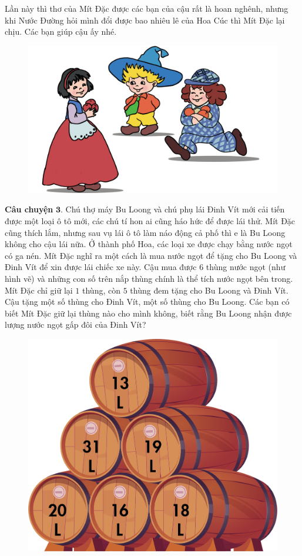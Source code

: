 	\vskip 0.1cm
	Lần này thì thơ của Mít Đặc được các bạn của cậu rất là hoan nghênh, nhưng khi Nước Đường hỏi mình đổi được bao nhiêu lê của Hoa Cúc thì Mít Đặc lại chịu. Các bạn giúp cậu ấy nhé.
	\begin{figure}[H]
		\centering
		\vspace*{-5pt}
		\captionsetup{labelformat= empty, justification=centering}
		\includegraphics[width=0.6\linewidth]{Hinh4_TaoLe}
		\vspace*{-10pt}
	\end{figure}
	\textbf{\color{toancuabi}Câu chuyện} $\pmb{3.}$ Chú thợ máy Bu Loong và chú phụ lái Đinh Vít mới cải tiến được một loại ô tô mới, các chú tí hon ai cũng háo hức để được lái thử. Mít Đặc cũng thích lắm, nhưng sau vụ lái ô tô làm náo động cả phố thì e là Bu Loong không cho cậu lái nữa. Ở thành phố Hoa, các loại xe được chạy bằng nước ngọt có ga nén. Mít Đặc nghĩ ra một cách là mua nước ngọt để tặng cho Bu Loong và Đinh Vít để xin được lái chiếc xe này. Cậu mua được $6$ thùng nước ngọt (như hình vẽ) và những con số trên nắp thùng chính là thể tích nước ngọt bên trong. Mít Đặc chỉ giữ lại $1$ thùng, còn $5$ thùng đem tặng cho Bu Loong và Đinh Vít. Cậu tặng một số thùng cho Đinh Vít, một số thùng cho Bu Loong. Các bạn có biết Mít Đặc giữ lại thùng nào cho mình không, biết rằng Bu Loong nhận được lượng nước ngọt gấp đôi của Đinh Vít?
		\begin{figure}[H]
		\centering
		\vspace*{-5pt}
		\captionsetup{labelformat= empty, justification=centering}
		\includegraphics[width=0.4\linewidth]{Hinh5}
		\vspace*{-10pt}
	\end{figure}
